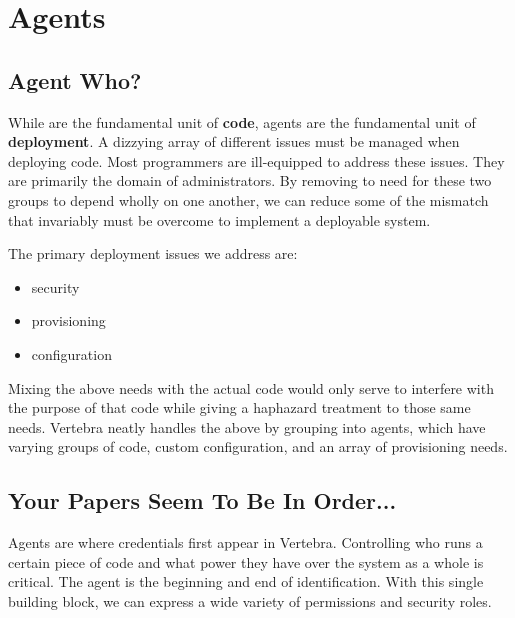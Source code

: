 \newcommand{\agent}{{\sf agent}}
\newcommand{\agents}{{\sf agents}}
\newcommand{\Agent}{{\sf Agent}}
\newcommand{\Agents}{{\sf Agents}}

\section{Agents}

\subsection{Agent Who?}

While \actors{} are the fundamental unit of \textbf{code}, \agents{} are the fundamental unit of \textbf{deployment}.  A dizzying array of different issues must be managed when deploying code.  Most programmers are ill-equipped to address these issues.  They are primarily the domain of administrators.  By removing to need for these two groups to depend wholly on one another, we can reduce some of the mismatch that invariably must be overcome to implement a deployable system.

The primary deployment issues we address are:

\begin{itemize}
        \item security
        \item provisioning
        \item configuration
\end{itemize}

Mixing the above needs with the actual code would only serve to interfere with the purpose of that code while giving a haphazard treatment to those same needs.  Vertebra neatly handles the above by grouping \actors{} into \agents{}, which have varying groups of \actor{} code, custom configuration, and an array of provisioning needs.

\subsection{Your Papers Seem To Be In Order...}

\Agents{} are where credentials first appear in Vertebra.  Controlling who runs a certain piece of code and what power they have over the system as a whole is critical.  The \agent{} is the beginning and end of identification.  With this single building block, we can express a wide variety of permissions and security roles.


